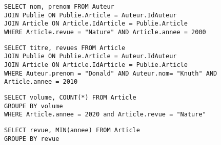 \documentclass[11pt,a4paper]{article}
\begin{document}
\begin{Exercise}[title = {Base de données de publications scientifiques}]
    \begin{verbatim}
SELECT nom, prenom FROM Auteur 
JOIN Publie ON Publie.Article = Auteur.IdAuteur
JOIN Article ON Article.IdArticle = Publie.Article
WHERE Article.revue = "Nature" AND Article.annee = 2000
    \end{verbatim}
    \begin{verbatim}
SELECT titre, revues FROM Article 
JOIN Publie ON Publie.Article = Auteur.IdAuteur
JOIN Article ON Article.IdArticle = Publie.Article
WHERE Auteur.prenom = "Donald" AND Auteur.nom= "Knuth" AND Article.annee = 2010
    \end{verbatim}
    \begin{verbatim}
SELECT volume, COUNT(*) FROM Article 
GROUPE BY volume
WHERE Article.annee = 2020 and Article.revue = "Nature"
    \end{verbatim}
    \begin{verbatim}
SELECT revue, MIN(annee) FROM Article 
GROUPE BY revue
    \end{verbatim}
\end{Exercise}
\end{document}
